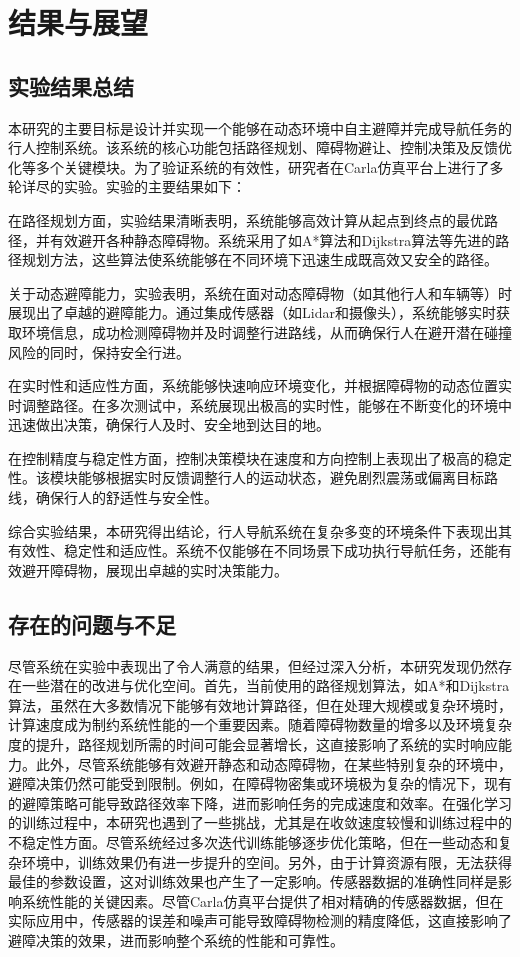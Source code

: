 \chapter{结果与展望}

\section{实验结果总结}
本研究的主要目标是设计并实现一个能够在动态环境中自主避障并完成导航任务的行人控制系统。该系统的核心功能包括路径规划、障碍物避让、控制决策及反馈优化等多个关键模块。为了验证系统的有效性，研究者在Carla仿真平台上进行了多轮详尽的实验。实验的主要结果如下：

在路径规划方面，实验结果清晰表明，系统能够高效计算从起点到终点的最优路径，并有效避开各种静态障碍物。系统采用了如A*算法和Dijkstra算法等先进的路径规划方法，这些算法使系统能够在不同环境下迅速生成既高效又安全的路径。

关于动态避障能力，实验表明，系统在面对动态障碍物（如其他行人和车辆等）时展现出了卓越的避障能力。通过集成传感器（如Lidar和摄像头），系统能够实时获取环境信息，成功检测障碍物并及时调整行进路线，从而确保行人在避开潜在碰撞风险的同时，保持安全行进。

在实时性和适应性方面，系统能够快速响应环境变化，并根据障碍物的动态位置实时调整路径。在多次测试中，系统展现出极高的实时性，能够在不断变化的环境中迅速做出决策，确保行人及时、安全地到达目的地。

在控制精度与稳定性方面，控制决策模块在速度和方向控制上表现出了极高的稳定性。该模块能够根据实时反馈调整行人的运动状态，避免剧烈震荡或偏离目标路线，确保行人的舒适性与安全性。

综合实验结果，本研究得出结论，行人导航系统在复杂多变的环境条件下表现出其有效性、稳定性和适应性。系统不仅能够在不同场景下成功执行导航任务，还能有效避开障碍物，展现出卓越的实时决策能力。

\section{存在的问题与不足}
尽管系统在实验中表现出了令人满意的结果，但经过深入分析，本研究发现仍然存在一些潜在的改进与优化空间。首先，当前使用的路径规划算法，如A*和Dijkstra算法，虽然在大多数情况下能够有效地计算路径，但在处理大规模或复杂环境时，计算速度成为制约系统性能的一个重要因素。随着障碍物数量的增多以及环境复杂度的提升，路径规划所需的时间可能会显著增长，这直接影响了系统的实时响应能力。此外，尽管系统能够有效避开静态和动态障碍物，在某些特别复杂的环境中，避障决策仍然可能受到限制。例如，在障碍物密集或环境极为复杂的情况下，现有的避障策略可能导致路径效率下降，进而影响任务的完成速度和效率。在强化学习的训练过程中，本研究也遇到了一些挑战，尤其是在收敛速度较慢和训练过程中的不稳定性方面。尽管系统经过多次迭代训练能够逐步优化策略，但在一些动态和复杂环境中，训练效果仍有进一步提升的空间。另外，由于计算资源有限，无法获得最佳的参数设置，这对训练效果也产生了一定影响。传感器数据的准确性同样是影响系统性能的关键因素。尽管Carla仿真平台提供了相对精确的传感器数据，但在实际应用中，传感器的误差和噪声可能导致障碍物检测的精度降低，这直接影响了避障决策的效果，进而影响整个系统的性能和可靠性。

